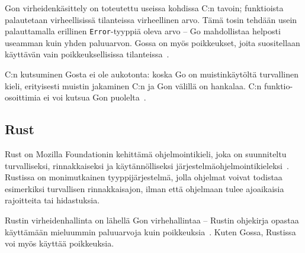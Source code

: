 Gon virheidenkäsittely on toteutettu useissa kohdissa C:n tavoin; funktioista
palautetaan virheellisissä tilanteissa virheellinen arvo. Tämä tosin tehdään
usein palauttamalla erillinen \texttt{Error}-tyyppiä oleva arvo -- Go
mahdollistaa helposti useamman kuin yhden paluuarvon. Gossa on myös
poikkeukset, joita suositellaan käyttävän vain poikkeuksellisissa
tilanteissa~\citep{effectivego}.

C:n kutsuminen Gosta ei ole aukotonta: koska Go on muistinkäytöltä turvallinen
kieli, erityisesti muistin jakaminen C:n ja Gon välillä on hankalaa. C:n
funktio-osoittimia ei voi kutsua Gon puolelta~\citep{cgo}.

\subsection{Rust}

Rust on Mozilla Foundationin kehittämä ohjelmointikieli, joka on suunniteltu
turvalliseksi, rinnakkaiseksi ja käytännölliseksi
järjestelmäohjelmointikieleksi~\citep{rustfaq}. Rustissa on monimutkainen
tyyppijärjestelmä, jolla ohjelmat voivat todistaa esimerkiksi turvallisen
rinnakkaisajon, ilman että ohjelmaan tulee ajoaikaisia rajoitteita tai
hidastuksia.

Rustin virheidenhallinta on lähellä Gon virhehallintaa -- Rustin ohjekirja
opastaa käyttämään mieluummin paluuarvoja kuin
poikkeuksia~\citep{rusterrorhandling}. Kuten Gossa, Rustissa voi myös käyttää
poikkeuksia.
